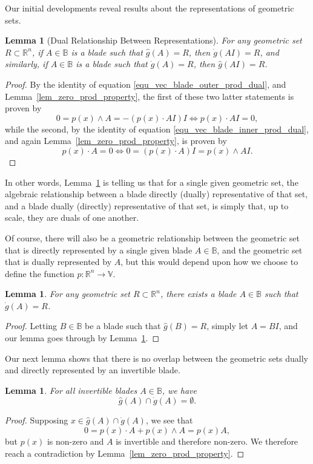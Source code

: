 \documentclass{birkjour}
\newtheorem{lem}[thm]{Lemma}
\theoremstyle{definition}
\theoremstyle{remark}
\numberwithin{equation}{section}
\newcommand{\R}{\mathbb{R}}
\newcommand{\B}{\mathbb{B}}
\newcommand{\V}{\mathbb{V}}
\newcommand{\gd}{\dot{g}}
\newcommand{\gh}{\hat{g}}
\begin{document}
Our initial developments reveal results about the representations of geometric sets.

\begin{lem}[Dual Relationship Between Representations]\label{lem_dual_relationship_in_rep}
For any geometric set $R\subset\R^n$, if $A\in\B$ is a blade such that $\gh(A)=R$,
then $\gd(AI)=R$, and similarly, if $A\in\B$ is a blade such that $\gd(A)=R$, then $\gh(AI)=R$.
\end{lem}
\begin{proof}
By the identity of equation \eqref{equ_vec_blade_outer_prod_dual}, and Lemma~\ref{lem_zero_prod_property},
the first of these two latter statements is proven by
\begin{equation}
0=p(x)\wedge A=-(p(x)\cdot AI)I\iff p(x)\cdot AI=0,
\end{equation}
while the second, by the identity of equation \eqref{equ_vec_blade_inner_prod_dual},
and again Lemma~\ref{lem_zero_prod_property}, is proven by
\begin{equation}
p(x)\cdot A=0\iff 0=(p(x)\cdot A)I=p(x)\wedge AI.
\end{equation}
\end{proof}

In other words, Lemma~\ref{lem_dual_relationship_in_rep} is telling us that for a single given geometric set, the
algebraic relationship between a blade directly (dually) representative of that set,
and a blade dually (directly) representative of that set, is simply that, up to scale, they
are duals of one another.

Of course, there will also be a geometric relationship between the geometric set that is directly represented by a single
given blade $A\in\B$, and the geometric set that is dually represented by $A$, but this would depend upon how we choose to define
the function $p:\R^n\to\V$.

\begin{lem}
For any geometric set $R\subset\R^n$, there exists a blade $A\in\B$ such that
$\gd(A)=R$.
\end{lem}
\begin{proof}
Letting $B\in\B$ be a blade such that $\gh(B)=R$, simply let $A=BI$, and our
lemma goes through by Lemma~\ref{lem_dual_relationship_in_rep}.
\end{proof}

Our next lemma shows that there is no overlap between the geometric sets dually and directly
represented by an invertible blade.

\begin{lem}
For all invertible blades $A\in\B$, we have
\begin{equation}
\gh(A)\cap\gd(A)=\emptyset.
\end{equation}
\end{lem}
\begin{proof}
Supposing $x\in\gh(A)\cap\gd(A)$, we see that
\begin{equation}
0 = p(x)\cdot A + p(x)\wedge A = p(x)A,
\end{equation}
but $p(x)$ is non-zero and $A$ is invertible and therefore non-zero.  We therefore reach a
contradiction by Lemma~\ref{lem_zero_prod_property}.
\end{proof}
\end{document}
